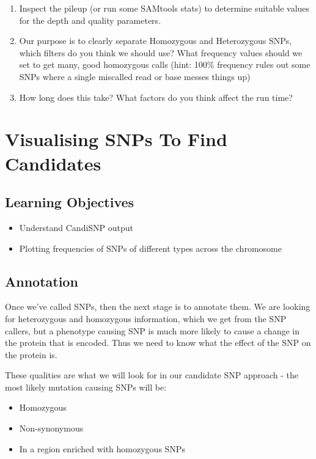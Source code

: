 \documentclass[12pt,]{book}
\providecommand{\tightlist}{%
  \setlength{\itemsep}{0pt}\setlength{\parskip}{0pt}}
\theoremstyle{definition}
\theoremstyle{definition}
\theoremstyle{remark}
\begin{document}
\begin{enumerate}
\def\labelenumi{\arabic{enumi}.}
\tightlist
\item
  Inspect the pileup (or run some SAMtools stats) to determine suitable
  values for the depth and quality parameters.
\item
  Our purpose is to clearly separate Homozygous and Heterozygous SNPs,
  which filters do you think we should use? What frequency values should
  we set to get many, good homozygous calls (hint: 100\% frequency rules
  out some SNPs where a single miscalled read or base messes things up)
\item
  How long does this take? What factors do you think affect the run
  time?
\end{enumerate}

\chapter{Visualising SNPs To Find
Candidates}\label{visualising-snps-to-find-candidates}

\section{Learning Objectives}\label{learning-objectives-4}

\begin{itemize}
\tightlist
\item
  Understand CandiSNP output
\item
  Plotting frequencies of SNPs of different types across the chromosome
\end{itemize}

\section{Annotation}\label{annotation}

Once we've called SNPs, then the next stage is to annotate them. We are
looking for heterozygous and homozygous information, which we get from
the SNP callers, but a phenotype causing SNP is much more likely to
cause a change in the protein that is encoded. Thus we need to know what
the effect of the SNP on the protein is.

These qualities are what we will look for in our candidate SNP approach
- the most likely mutation causing SNPs will be:

\begin{itemize}
\tightlist
\item
  Homozygous
\item
  Non-synonymous
\item
  In a region enriched with homozygous SNPs
\end{itemize}
\end{document}
